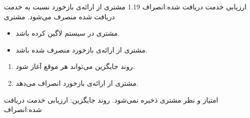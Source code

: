 {\alternativeflow
{
ارزیابی خدمت دریافت شده:انصراف
}
{1.19}
{
مشتری از ارائه‌ی بازخورد نسبت به خدمت دریافت شده منصرف می‌شود.
}
{
	مشتری
}
{}
{
	\begin{itemize}
		\vspace*{-0.6cm}
		\item 
		مشتری در سیستم لاگین کرده باشد.
		\item
		مشتری از ارائه‌ی بازخورد منصرف شده باشد.
	\end{itemize}
}
{
	\vspace*{-0.6cm}
	\begin{enumerate}
		\item 
		روند جایگزین می‌تواند هر موقع آغاز شود.
		\item
		مشتری از ارائه‌ی بازخورد انصراف می‌دهد.
	\end{enumerate}
}
{
امتیاز و نظر مشتری ذخیره نمی‌شود.
}
{
روند جایگزین: ارزیابی خدمت دریافت شده:انصراف
}


}

